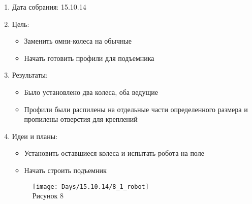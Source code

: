 
	\begin{enumerate}
	\item Дата собрания: 15.10.14
	\item Цель:
		\begin{itemize}
		\item Заменить омни-колеса на обычные
		\item Начать готовить профили для подъемника
		\end{itemize}
	\item Результаты:
		\begin{itemize}
		\item Было установлено два колеса, оба ведущие
		\item Профили были распилены на отдельные части определенного размера и пропилены отверстия для креплений
		\end{itemize}
	\item Идеи и планы:
		\begin{itemize}
		\item Установить оставшиеся колеса и испытать робота на поле
		\item Начать строить подъемник
		\end{itemize}
		\begin{figure} [h]
			\centering
			\begin{minipage}{0.3\linewidth}
				\texttt{[image: Days/15.10.14/8\_1\_robot]}\\ Рисунок 8
			\end{minipage}
		\end{figure}
	\end{enumerate}
\newpage
	
